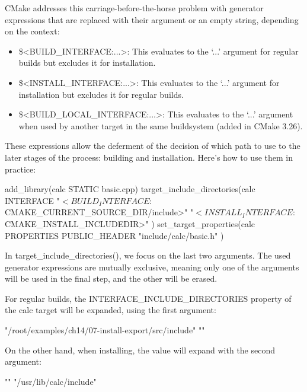 CMake addresses this carriage-before-the-horse problem with generator expressions that are replaced with their argument or an empty string, depending on the context:

\begin{itemize}
\item
\$<BUILD\_INTERFACE:...>: This evaluates to the ‘...' argument for regular builds but excludes it for installation.

\item
\$<INSTALL\_INTERFACE:...>: This evaluates to the ‘...' argument for installation but excludes it for regular builds.

\item
\$<BUILD\_LOCAL\_INTERFACE:...>: This evaluates to the ‘...' argument when used by another target in the same buildsystem (added in CMake 3.26).
\end{itemize}

These expressions allow the deferment of the decision of which path to use to the later stages of the process: building and installation. Here’s how to use them in practice:


\begin{cmake}
add_library(calc STATIC basic.cpp)
target_include_directories(calc INTERFACE
    "$<BUILD_INTERFACE:${CMAKE_CURRENT_SOURCE_DIR}/include>"
    "$<INSTALL_INTERFACE:${CMAKE_INSTALL_INCLUDEDIR}>"
)
set_target_properties(calc PROPERTIES
    PUBLIC_HEADER "include/calc/basic.h"
)
\end{cmake}

In target\_include\_directories(), we focus on the last two arguments. The used generator expressions are mutually exclusive, meaning only one of the arguments will be used in the final step, and the other will be erased.

For regular builds, the INTERFACE\_INCLUDE\_DIRECTORIES property of the calc target will be expanded, using the first argument:

\begin{cmake}
"/root/examples/ch14/07-install-export/src/include" ""
\end{cmake}

On the other hand, when installing, the value will expand with the second argument:

\begin{cmake}
"" "/usr/lib/calc/include"
\end{cmake}

